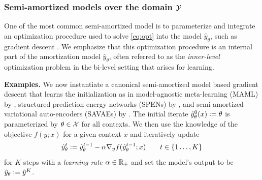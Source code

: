 \documentclass[twoside,11pt]{article}
\begin{document}
\subsubsection{Semi-amortized models over the domain ${\mathcal{Y}}$}
\label{sec:semi-domain}
\begin{center}
\end{center}
\vspace{-3mm}

One of the most common semi-amortized model is to
parameterize and integrate an optimization procedure
used to solve \cref{eq:opt} into the model $\hat y_\theta$,
such as gradient descent \citep{andrychowicz2016learning,finn2017model,kim2018semi}.
We emphasize that this optimization procedure is
an internal part of the amortization model $\hat y_\theta$,
often referred to as the \emph{inner-level} optimization
problem in the bi-level setting that arises for learning.

\textbf{Examples.}
We now instantiate a canonical semi-amortized model based
gradient descent that learns the initialization as in
model-agnostic meta-learning (MAML) by \citet{finn2017model},
structured prediction energy networks (SPENs) by \citet{belanger2017end},
and semi-amortized variational auto-encoders (SAVAEs) by \citet{kim2018semi}.
The initial iterate $\hat y^{0}_\theta(x)\vcentcolon= \theta$
is parameterized by $\theta\in{\mathcal{X}}$ for all contexts.
We then use the knowledge of the objective $f(y;x)$
for a given context $x$ and iteratively update
\begin{equation}
  \hat y^{t}_\theta \vcentcolon= \hat y^{t-1}_\theta - \alpha \nabla_y f(\hat y^{t-1}_\theta; x) \qquad t\in\{1\ldots,K\}
  \label{eq:gd}
\end{equation}
for $K$ steps with a \emph{learning rate} $\alpha\in\mathbb{R}_+$
and set the model's output to be
$\hat y_\theta\vcentcolon= \hat y^{K}$.
\end{document}
